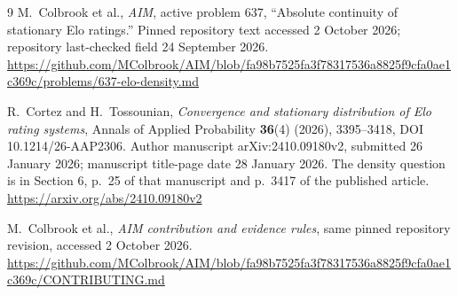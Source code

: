 \documentclass[11pt]{article}
\theoremstyle{remark}
\begin{document}
\begin{thebibliography}{9}
M.~Colbrook et al., \emph{AIM}, active problem 637, ``Absolute continuity of stationary Elo ratings.'' Pinned repository text accessed 2 October 2026; repository last-checked field 24 September 2026.\newline
\url{https://github.com/MColbrook/AIM/blob/fa98b7525fa3f78317536a8825f9cfa0ae1c369c/problems/637-elo-density.md}

R.~Cortez and H.~Tossounian, \emph{Convergence and stationary distribution of Elo rating systems}, Annals of Applied Probability \textbf{36}(4) (2026), 3395--3418, DOI 10.1214/26-AAP2306. Author manuscript arXiv:2410.09180v2, submitted 26 January 2026; manuscript title-page date 28 January 2026. The density question is in Section 6, p.~25 of that manuscript and p.~3417 of the published article.\newline
\url{https://arxiv.org/abs/2410.09180v2}

M.~Colbrook et al., \emph{AIM contribution and evidence rules}, same pinned repository revision, accessed 2 October 2026.\newline
\url{https://github.com/MColbrook/AIM/blob/fa98b7525fa3f78317536a8825f9cfa0ae1c369c/CONTRIBUTING.md}
\end{thebibliography}
\end{document}
